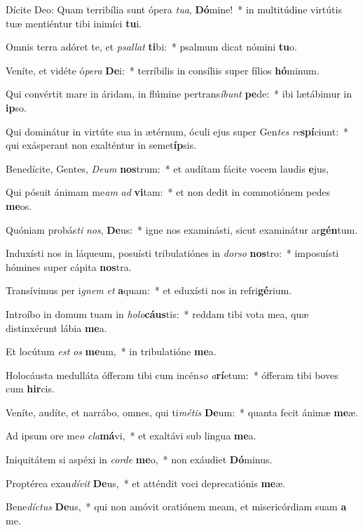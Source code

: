 \item Dícite Deo: Quam terribília sunt ópera \textit{tu}\textit{a}, \textbf{Dó}mine!~* in multitúdine virtútis tuæ mentiéntur tibi inimíci \textbf{tu}i.
\item Omnis terra adóret te, et \textit{psal}\textit{lat} \textbf{ti}bi:~* psalmum dicat nómini \textbf{tu}o.
\item Veníte, et vidéte ó\textit{pe}\textit{ra} \textbf{De}i:~* terríbilis in consíliis super fílios \textbf{hó}minum.
\item Qui convértit mare in áridam, in flúmine pertrans\textit{í}\textit{bunt} \textbf{pe}de:~* ibi lætábimur in \textbf{ip}so.
\item Qui dominátur in virtúte sua in ætérnum, óculi ejus super Gen\textit{tes} \textit{re}\textbf{spí}ciunt:~* qui exásperant non exalténtur in semet\textbf{íp}sis.
\item Benedícite, Gentes, \textit{De}\textit{um} \textbf{nos}trum:~* et audítam fácite vocem laudis \textbf{e}jus,
\item Qui pósuit ánimam me\textit{am} \textit{ad} \textbf{vi}tam:~* et non dedit in commotiónem pedes \textbf{me}os.
\item Quóniam probás\textit{ti} \textit{nos}, \textbf{De}us:~* igne nos examinásti, sicut examinátur ar\textbf{gén}tum.
\item Induxísti nos in láqueum, posuísti tribulatiónes in \textit{dor}\textit{so} \textbf{nos}tro:~* imposuísti hómines super cápita \textbf{nos}tra.
\item Transívimus per i\textit{gnem} \textit{et} \textbf{a}quam:~* et eduxísti nos in refri\textbf{gé}rium.
\item Introíbo in domum tuam in \textit{ho}\textit{lo}\textbf{cáus}tis:~* reddam tibi vota mea, quæ distinxérunt lábia \textbf{me}a.
\item Et locútum \textit{est} \textit{os} \textbf{me}um,~* in tribulatióne \textbf{me}a.
\item Holocáusta medulláta ófferam tibi cum incén\textit{so} \textit{a}\textbf{rí}etum:~* ófferam tibi boves cum \textbf{hir}cis.
\item Veníte, audíte, et narrábo, omnes, qui ti\textit{mé}\textit{tis} \textbf{De}um:~* quanta fecit ánimæ \textbf{me}æ.
\item Ad ipsum ore me\textit{o} \textit{cla}\textbf{má}vi,~* et exaltávi sub lingua \textbf{me}a.
\item Iniquitátem si aspéxi in \textit{cor}\textit{de} \textbf{me}o,~* non exáudiet \textbf{Dó}minus.
\item Proptérea exau\textit{dí}\textit{vit} \textbf{De}us,~* et atténdit voci deprecatiónis \textbf{me}æ.
\item Bene\textit{díc}\textit{tus} \textbf{De}us,~* qui non amóvit oratiónem meam, et misericórdiam suam \textbf{a} me.
